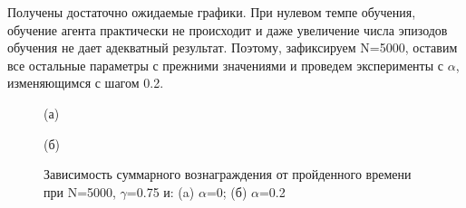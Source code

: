 \documentclass[a4paper]{report}
\theoremstyle{definition}
\theoremstyle{plain}
\theoremstyle{remark}
\theoremstyle{remark}
\theoremstyle{definition}
\begin{document}
Получены достаточно ожидаемые графики. При нулевом темпе обучения, обучение агента практически не происходит и даже увеличение числа эпизодов обучения не дает адекватный результат. Поэтому, зафиксируем N=5000, оставим все остальные параметры с прежними значениями и проведем эксперименты с $\alpha$, изменяющимся с шагом 0.2.

\begin{figure}[H]
    \begin{minipage}[H]{0.49\linewidth}
        (а)\\
    \end{minipage}
    \hfill
    \begin{minipage}[H]{0.49\linewidth}
        (б)\\
    \end{minipage}
      \caption{Зависимость суммарного вознаграждения от пройденного времени при N=5000, $\gamma$=0.75 и: (a) $\alpha$=0; (б) $\alpha$=0.2}
\end{figure}
\end{document}
